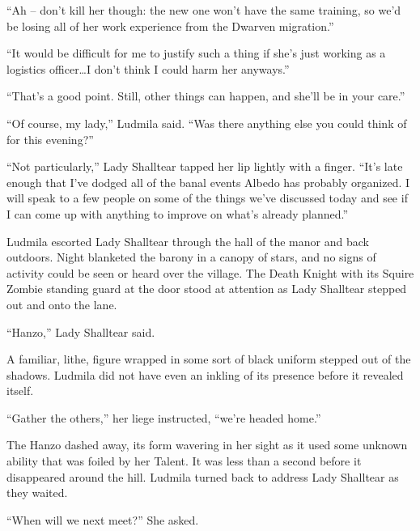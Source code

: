  

“Ah – don’t kill her though: the new one won’t have the same training, so we’d be losing all of her work experience from the Dwarven migration.”

 

“It would be difficult for me to justify such a thing if she’s just working as a logistics officer…I don’t think I could harm her anyways.”

 

“That’s a good point. Still, other things can happen, and she’ll be in your care.”

 

“Of course, my lady,” Ludmila said. “Was there anything else you could think of for this evening?”

 

“Not particularly,” Lady Shalltear tapped her lip lightly with a finger. “It’s late enough that I’ve dodged all of the banal events Albedo has probably organized. I will speak to a few people on some of the things we’ve discussed today and see if I can come up with anything to improve on what’s already planned.”

 

Ludmila escorted Lady Shalltear through the hall of the manor and back outdoors. Night blanketed the barony in a canopy of stars, and no signs of activity could be seen or heard over the village. The Death Knight with its Squire Zombie standing guard at the door stood at attention as Lady Shalltear stepped out and onto the lane.

 

“Hanzo,” Lady Shalltear said.

 

A familiar, lithe, figure wrapped in some sort of black uniform stepped out of the shadows. Ludmila did not have even an inkling of its presence before it revealed itself.

 

“Gather the others,” her liege instructed, “we’re headed home.”

 

The Hanzo dashed away, its form wavering in her sight as it used some unknown ability that was foiled by her Talent. It was less than a second before it disappeared around the hill. Ludmila turned back to address Lady Shalltear as they waited.

 

“When will we next meet?” She asked.

 

